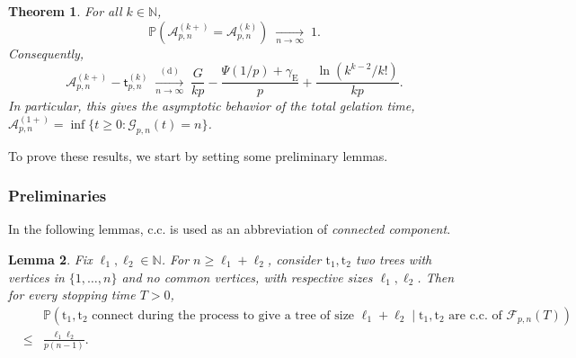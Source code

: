 \documentclass[a4, 11pt]{article}
\numberwithin{equation}{section}
\theoremstyle{plain}
\newtheorem{theorem}{Theorem}[section]
\newtheorem{lemma}[theorem]{Lemma}
\theoremstyle{definition}
\theoremstyle{remark}
\begin{document}
\begin{theorem}
\label{prop:A_k_continu}
For all $k \in \mathbb N$, 
$$
\mathbb P\left(\mathcal A^{(k+)}_{p,n} =\mathcal A_{p,n}^{(k)} \right)  \; \underset{n \rightarrow \infty}{\longrightarrow} \; 1.
$$
Consequently,
$$
\mathcal A_{p,n}^{(k+)} - \mathsf t^{(k)}_{p,n}  \; \underset{n \rightarrow \infty}{\overset{(\mathrm d)}\longrightarrow} \; \frac{G}{kp}-\frac{\Psi(1/p)+\gamma_{\mathrm E}}{p}+\frac{\ln (k^{k-2}/k!)}{kp}.
$$
In particular, this gives the asymptotic behavior of the total gelation time, $\mathcal A_{p,n}^{(1+)}=\inf\{t\geq 0:\mathcal G_{p,n}(t)=n\}$.
\end{theorem}

To prove these results, we start by setting some preliminary lemmas.

\subsubsection{Preliminaries}

In the following lemmas, c.c. is used as an abbreviation of \emph{connected component}. 

\begin{lemma}
Fix $\ell_1,\ell_2 \in \mathbb N$. For $n\geq \ell_1+\ell_2$, 
consider $\mathrm t_1,\mathrm t_2$ two trees with vertices in $\{1,\ldots,n\}$ and no common vertices, with respective sizes $\ell_1,\ell_2$. Then for every stopping time $T>0$,
\begin{eqnarray*}
&& \mathbb P\left(\mathrm t_1,\mathrm t_2 \text{ connect during the process to give a tree of size }\ell_1+\ell_2 \; | \; \mathrm t_1,\mathrm t_2 \text{ are c.c. of } \mathcal {F}_{p,n}(T)\right) \\
&\leq& \frac{\ell_1\ell_2}{p(n-1)}.
\end{eqnarray*}
\end{lemma}
\end{document}
